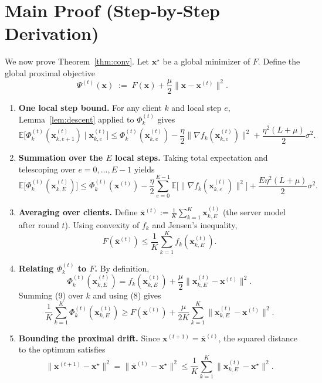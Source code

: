 \documentclass{article}
\newcommand{\E}{\mathbb{E}}
\begin{document}
\section*{Main Proof (Step‑by‑Step Derivation)}
We now prove Theorem~\ref{thm:conv}. Let $\mathbf{x}^{\star}$ be a global minimizer of $F$.  
Define the global proximal objective
\[
\Psi^{(t)}(\mathbf{x})\;:=\;F(\mathbf{x})+\frac{\mu}{2}\|\mathbf{x}-\mathbf{x}^{(t)}\|^{2}.
\]

\begin{enumerate}[label=[Step \arabic*], leftmargin=*, nosep]
\item \textbf{One local step bound.}  
For any client $k$ and local step $e$, Lemma~\ref{lem:descent} applied to $\Phi_{k}^{(t)}$ gives
\[
\E\!\bigl[\Phi_{k}^{(t)}(\mathbf{x}^{(t)}_{k,e+1})\mid\mathbf{x}^{(t)}_{k,e}\bigr]
\le
\Phi_{k}^{(t)}(\mathbf{x}^{(t)}_{k,e})
-\frac{\eta}{2}\|\nabla f_k(\mathbf{x}^{(t)}_{k,e})\|^{2}
+\frac{\eta^{2}(L+\mu)}{2}\sigma^{2}.
\tag{6}
\]

\item \textbf{Summation over the $E$ local steps.}  
Taking total expectation and telescoping over $e=0,\dots,E-1$ yields
\[
\E\!\bigl[\Phi_{k}^{(t)}(\mathbf{x}^{(t)}_{k,E})\bigr]
\le
\Phi_{k}^{(t)}(\mathbf{x}^{(t)})
-\frac{\eta}{2}\sum_{e=0}^{E-1}\E\!\bigl[\|\nabla f_k(\mathbf{x}^{(t)}_{k,e})\|^{2}\bigr]
+\frac{E\eta^{2}(L+\mu)}{2}\sigma^{2}.
\tag{7}
\]

\item \textbf{Averaging over clients.}  
Define $\overline{\mathbf{x}}^{(t)}:=\frac1K\sum_{k=1}^{K}\mathbf{x}^{(t)}_{k,E}$ (the server model after round $t$).  
Using convexity of $f_k$ and Jensen’s inequality,
\[
F(\overline{\mathbf{x}}^{(t)})\le\frac1K\sum_{k=1}^{K}f_k(\mathbf{x}^{(t)}_{k,E}).
\tag{8}
\]

\item \textbf{Relating $\Phi_{k}^{(t)}$ to $F$.}  
By definition,
\[
\Phi_{k}^{(t)}(\mathbf{x}^{(t)}_{k,E})
= f_k(\mathbf{x}^{(t)}_{k,E})+\frac{\mu}{2}\|\mathbf{x}^{(t)}_{k,E}-\mathbf{x}^{(t)}\|^{2}.
\tag{9}
\]
Summing (9) over $k$ and using (8) gives
\[
\frac1K\sum_{k=1}^{K}\Phi_{k}^{(t)}(\mathbf{x}^{(t)}_{k,E})
\ge
F(\overline{\mathbf{x}}^{(t)})+\frac{\mu}{2K}\sum_{k=1}^{K}\|\mathbf{x}^{(t)}_{k,E}-\mathbf{x}^{(t)}\|^{2}.
\tag{10}
\]

\item \textbf{Bounding the proximal drift.}  
Since $\mathbf{x}^{(t+1)}=\overline{\mathbf{x}}^{(t)}$, the squared distance to the optimum satisfies
\[
\|\mathbf{x}^{(t+1)}-\mathbf{x}^{\star}\|^{2}
= \|\overline{\mathbf{x}}^{(t)}-\mathbf{x}^{\star}\|^{2}
\le
\frac1K\sum_{k=1}^{K}\|\mathbf{x}^{(t)}_{k,E}-\mathbf{x}^{\star}\|^{2}.
\tag{11}
\]


\end{enumerate}
\end{document}

